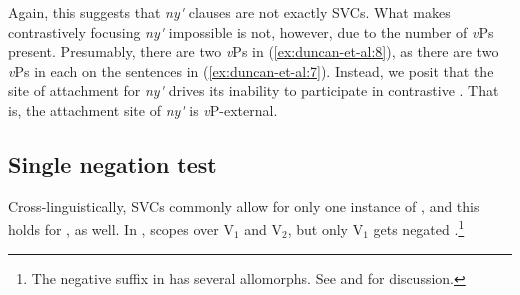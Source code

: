 \documentclass[output=paper
,newtxmath
,modfonts
,nonflat]{langsci/langscibook}
\begin{document}
 \label{ex:duncan-et-al:8}
\z

\noindent Again, this suggests that \textit{ny\'{\textturnv}\ng} clauses are not exactly SVCs. What makes contrastively focusing \textit{ny\'{\textturnv}\ng} impossible is not, however, due to the number of \textit{v}Ps present. Presumably, there are two \textit{v}Ps in (\ref{ex:duncan-et-al:8}), as there are two \textit{v}Ps in each on the sentences in (\ref{ex:duncan-et-al:7}). Instead, we posit that the site of attachment for \textit{ny\'{\textturnv}\ng} drives its inability to participate in contrastive . That is, the attachment site of \textit{ny\'{\textturnv}\ng} is \textit{v}P-external.

\subsection{Single negation test}\label{sec:duncan-et-al:2.3}

Cross-linguistically, SVCs commonly allow for only one instance of  \citep{hiraiwa2008object}, and this holds for , as well. In ,  scopes over V$_1$ and V$_2$, but only V$_1$ gets negated \citep{major2015serial}.\footnote{The negative suffix in  has several allomorphs. See \citet[124-127]{akinlabi2003} and \citet[89]{duncan2016parallel} for discussion.}

\ea\label{ex:duncan-et-al:9}
\z
\z
\end{document}
